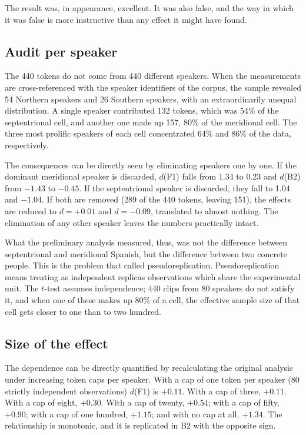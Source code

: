 \documentclass[11pt]{article}
\begin{document}
The result was, in appearance, excellent. It was also false, and the way in which
it was false is more instructive than any effect it might have found.

\subsection{Audit per speaker}

The 440 tokens do not come from 440 different speakers. When the measurements are
cross-referenced with the speaker identifiers of the corpus, the sample revealed
54 Northern speakers and 26 Southern speakers, with an extraordinarily unequal
distribution. A single speaker contributed 132 tokens, which was 54\% of the
septentrional cell, and another one made up 157, 80\% of the meridional cell. The
three most prolific speakers of each cell concentrated 64\% and 86\% of the data,
respectively.

The consequences can be directly seen by eliminating speakers one by one. If the
dominant meridional speaker is discarded, $d$(F1) falls from 1.34 to 0.23 and
$d$(B2) from $-1.43$ to $-0.45$. If the septentrional speaker is discarded, they
fall to 1.04 and $-1.04$. If both are removed (289 of the 440 tokens, leaving
151), the effects are reduced to $d = +0.01$ and $d = -0.09$, translated to
almost nothing. The elimination of any other speaker leaves the numbers
practically intact.

What the preliminary analysis measured, thus, was not the difference between
septentrional and meridional Spanish, but the difference between two concrete
people. This is the problem that \citet{hurlbert1984} called pseudoreplication.
Pseudoreplication means treating as independent replicas observations which share
the experimental unit. The $t$-test assumes independence; 440 clips from 80
speakers do not satisfy it, and when one of these makes up 80\% of a cell, the
effective sample size of that cell gets closer to one than to two hundred.

\subsection{Size of the effect}

The dependence can be directly quantified by recalculating the original analysis
under increasing token caps per speaker. With a cap of one token per speaker (80
strictly independent observations) $d$(F1) is $+0.11$. With a cap of three,
$+0.11$. With a cap of eight, $+0.30$. With a cap of twenty, $+0.54$; with a cap
of fifty, $+0.90$; with a cap of one hundred, $+1.15$; and with no cap at all,
$+1.34$. The relationship is monotonic, and it is replicated in B2 with the
opposite sign.
\end{document}
